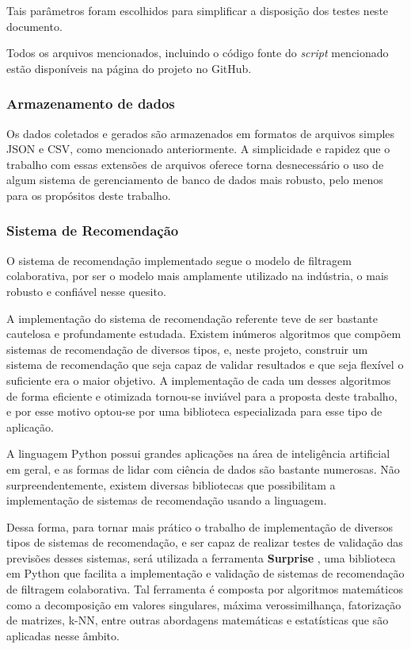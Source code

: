 \documentclass[
	12pt,				%
	oneside,			%
	a4paper,			%
	chapter=TITLE,		%
	english,			%
	french,				%
	spanish,			%
	brazil				%
	]{abntex2}
\begin{document}
Tais parâmetros foram escolhidos para simplificar a disposição dos testes neste documento.

Todos os arquivos mencionados, incluindo o código fonte do \emph{script} mencionado estão disponíveis na página do projeto no GitHub.

\subsubsection{Armazenamento de dados}

Os dados coletados e gerados são armazenados em formatos de arquivos simples JSON e CSV, como mencionado anteriormente. A simplicidade e rapidez que o trabalho com essas extensões de arquivos oferece torna desnecessário o uso de algum sistema de gerenciamento de banco de dados mais robusto, pelo menos para os propósitos deste trabalho.

\subsubsection{Sistema de Recomendação}

O sistema de recomendação implementado segue o modelo de filtragem colaborativa, por ser o modelo mais amplamente utilizado na indústria, o mais robusto e confiável nesse quesito.

A implementação do sistema de recomendação referente teve de ser bastante cautelosa e profundamente estudada. Existem inúmeros algoritmos que compõem sistemas de recomendação de diversos tipos, e, neste projeto, construir um sistema de recomendação que seja capaz de validar resultados e que seja flexível o suficiente era o maior objetivo. A implementação de cada um desses algoritmos de forma eficiente e otimizada tornou-se inviável para a proposta deste trabalho, e por esse motivo optou-se por uma biblioteca especializada para esse tipo de aplicação.

A linguagem Python possui grandes aplicações na área de inteligência artificial em geral, e as formas de lidar com ciência de dados são bastante numerosas. Não surpreendentemente, existem diversas bibliotecas que possibilitam a implementação de sistemas de recomendação usando a linguagem.

Dessa forma, para tornar mais prático o trabalho de implementação de diversos tipos de sistemas de recomendação, e ser capaz de realizar testes de validação das previsões desses sistemas, será utilizada a ferramenta \textbf{Surprise} \cite{Surprise}, uma biblioteca em Python que facilita a implementação e validação de sistemas de recomendação de filtragem colaborativa. Tal ferramenta é composta por algoritmos matemáticos como a decomposição em valores singulares, máxima verossimilhança, fatorização de matrizes, k-NN, entre outras abordagens matemáticas e estatísticas que são aplicadas nesse âmbito.
\end{document}
